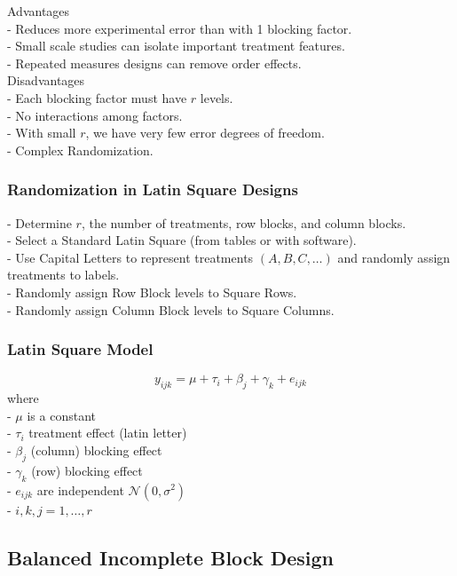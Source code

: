 \documentclass[11pt,a4paper]{article}
\begin{document}
Advantages\\
- Reduces more experimental error than with 1 blocking factor.\\
- Small scale studies can isolate important treatment features.\\
- Repeated measures designs can remove order effects.\\

Disadvantages\\
- Each blocking factor must have $r$ levels.\\
- No interactions among factors.\\
- With small $r$, we have very few error degrees of freedom.\\
- Complex Randomization.\\

\subsubsection{ Randomization in Latin Square Designs}
- Determine $r$, the number of treatments, row blocks, and column blocks.\\
- Select a Standard Latin Square (from tables or with software).\\
- Use Capital Letters to represent treatments $(A, B, C, \ldots)$ and randomly assign treatments to labels.\\
- Randomly assign Row Block levels to Square Rows.\\
- Randomly assign Column Block levels to Square Columns.\\

\subsubsection{ Latin Square Model}
$$
y_{i j k}=\mu+\tau_{i}+\beta_{j}+\gamma_{k}+e_{i j k}
$$
where\\
- $\mu$ is a constant\\
- $\tau_{i}$ treatment effect (latin letter)\\
- $\beta_{j}$ (column) blocking effect\\
- $\gamma_{k}$ (row) blocking effect\\
- $e_{i j k}$ are independent $\mathcal{N}\left(0, \sigma^{2}\right)$\\
- $i, k, j=1, \ldots, r$\\


\subsection{ Balanced Incomplete Block Design}
\end{document}
